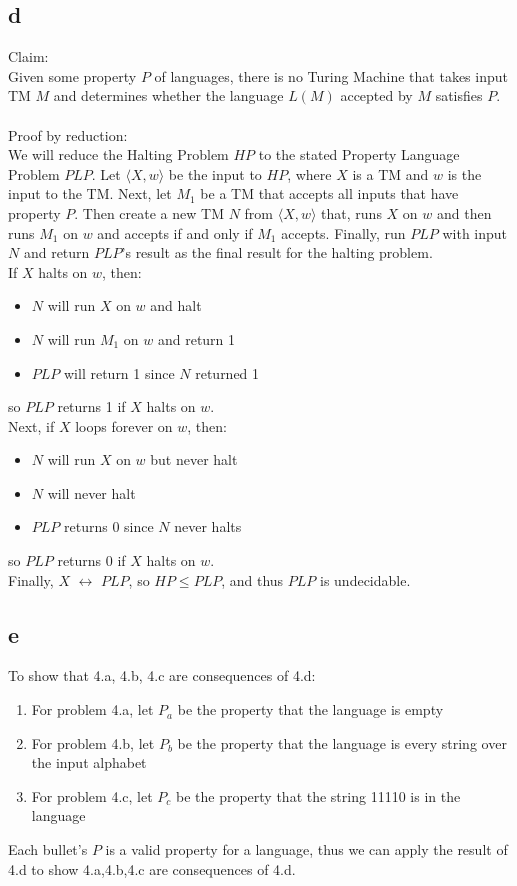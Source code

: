 \documentclass[letterpaper,notitlepage,twoside]{article}
\begin{document}
\subsection*{d}
Claim:\\
Given some property $P$ of languages, there is no Turing Machine that takes input TM $M$ and determines whether the language $L(M)$ accepted by $M$ satisfies $P$.\\\\
Proof by reduction:\\
We will reduce the Halting Problem $HP$ to the stated Property Language Problem $PLP$. Let $\langle X, w \rangle$ be the input to $HP$, where $X$ is a TM and $w$ is the input to the TM. Next, let $M_1$ be a TM that accepts all inputs that have property $P$. Then create a new TM $N$ from $\langle X, w \rangle$ that, runs $X$ on $w$ and then runs $M_1$ on $w$ and accepts if and only if $M_1$ accepts. Finally, run $PLP$ with input $N$ and return $PLP$'s result as the final result for the halting problem.\\
If $X$ halts on $w$, then:
\begin{itemize}
\item $N$ will run $X$ on $w$ and halt
\item $N$ will run $M_1$ on $w$ and return 1
\item $PLP$ will return 1 since $N$ returned 1
\end{itemize}
so $PLP$ returns 1 if $X$ halts on $w$.\\
Next, if $X$ loops forever on $w$, then:
\begin{itemize}
\item $N$ will run $X$ on $w$ but never halt
\item $N$ will never halt
\item $PLP$ returns 0 since $N$ never halts
\end{itemize}
so $PLP$ returns 0 if $X$ halts on $w$.\\
Finally, $X$ $\leftrightarrow$ $PLP$, so $HP \le PLP$, and thus $PLP$ is undecidable.

\subsection*{e}
To show that 4.a, 4.b, 4.c are consequences of 4.d:
\begin{enumerate}
\item For problem 4.a, let $P_a$ be the property that the language is empty
\item For problem 4.b, let $P_b$ be the property that the language is every string over the input alphabet
\item For problem 4.c, let $P_c$ be the property that the string 11110 is in the language
\end{enumerate}
Each bullet's $P$ is a valid property for a language, thus we can apply the result of 4.d to show 4.a,4.b,4.c are consequences of 4.d.
\end{document}
